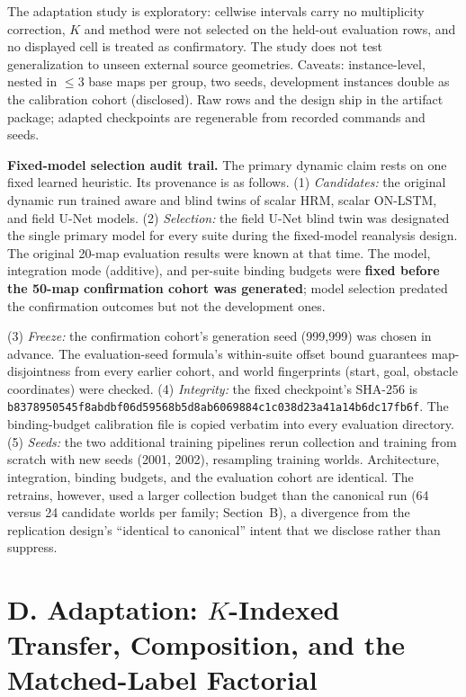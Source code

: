 \documentclass[letterpaper]{article} %
\begin{document}
The adaptation study is exploratory: cellwise intervals carry no multiplicity correction, $K$ and method were not selected on the held-out evaluation rows, and no displayed cell is treated as confirmatory. The study does not test generalization to unseen external source geometries. Caveats: instance-level, nested in $\leq$3 base maps per group, two seeds, development instances double as the calibration cohort (disclosed). Raw rows and the design ship in the artifact package; adapted checkpoints are regenerable from recorded commands and seeds.

\textbf{Fixed-model selection audit trail.} The primary dynamic claim rests on one fixed learned heuristic. Its provenance is as follows. (1) \emph{Candidates:} the original dynamic run trained aware and blind twins of scalar HRM, scalar ON-LSTM, and field U-Net models. (2) \emph{Selection:} the field U-Net blind twin was designated the single primary model for every suite during the fixed-model reanalysis design. The original 20-map evaluation results were known at that time. The model, integration mode (additive), and per-suite binding budgets were \textbf{fixed before the 50-map confirmation cohort was generated}; model selection predated the confirmation outcomes but not the development ones.

(3) \emph{Freeze:} the confirmation cohort's generation seed (999{,}999) was chosen in advance. The evaluation-seed formula's within-suite offset bound guarantees map-disjointness from every earlier cohort, and world fingerprints (start, goal, obstacle coordinates) were checked. (4) \emph{Integrity:} the fixed checkpoint's SHA-256 is \texttt{b8378950545f8abd\allowbreak bf06d59568b5d8ab\allowbreak 6069884c1c038d23\allowbreak a41a14b6dc17fb6f}. The binding-budget calibration file is copied verbatim into every evaluation directory. (5) \emph{Seeds:} the two additional training pipelines rerun collection and training from scratch with new seeds (2001, 2002), resampling training worlds. Architecture, integration, binding budgets, and the evaluation cohort are identical. The retrains, however, used a larger collection budget than the canonical run (64 versus 24 candidate worlds per family; Section~B), a divergence from the replication design's ``identical to canonical'' intent that we disclose rather than suppress.

\clearpage
\section{D. Adaptation: $K$-Indexed Transfer, Composition, and the Matched-Label Factorial}
\end{document}
